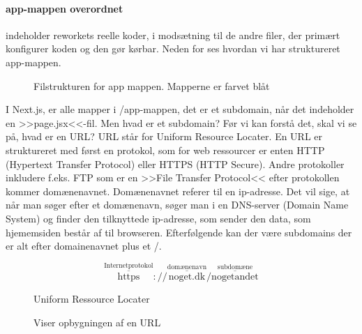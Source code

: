         \paragraph{app-mappen overordnet \label{pgh:app-ov}} indeholder reworkets reelle koder, i modsætning til de andre filer, der primært konfigurer koden og den gør kørbar. 
        Neden for ses hvordan vi har struktureret app-mappen. 
        \begin{figure}[H]
            \caption{Filstrukturen for app mappen. Mapperne er farvet blåt}
            \label{fig:tlprojstruct}
            \end{figure}
        I Next.js, er alle mapper i /app-mappen, det er et subdomain, når det indeholder en >>page.jsx<<-fil. Men hvad er et subdomain? Før vi kan forstå det, skal vi se på, hvad er en URL? URL står for 
        Uniform Resource Locater. En URL er struktureret med først en protokol, som for web ressourcer er enten HTTP (Hypertext Transfer Protocol) eller HTTPS (HTTP Secure). Andre protokoller inkludere f.eks. FTP som er en >>File Transfer Protocol<<  
        efter protokollen kommer domænenavnet. Domænenavnet referer til en ip-adresse.  Det vil sige, at når man søger efter et domænenavn, søger man i en DNS-server (Domain Name System) og finder den tilknyttede ip-adresse,
        som sender den data, som hjememsiden består af til browseren. Efterfølgende kan der være subdomains der er alt efter domainenavnet plus et /.

        \begin{figure}[H]
        \begin{mdframed}
        \begin{equation*}
        \stackrel{\text{Internetprotokol}}{\overline{\text{https}}}:// \stackrel{\text{domænenavn}}{\overline{\text{noget.dk}}} / \stackrel{\text{subdomæne}}{\overline{\text{nogetandet}}}
        \end{equation*}
        \begin{center}
            Uniform Ressource Locater
        \end{center}
        \end{mdframed}
        \caption{Viser opbygningen af en URL}
        \end{figure}
        \newpage
        
